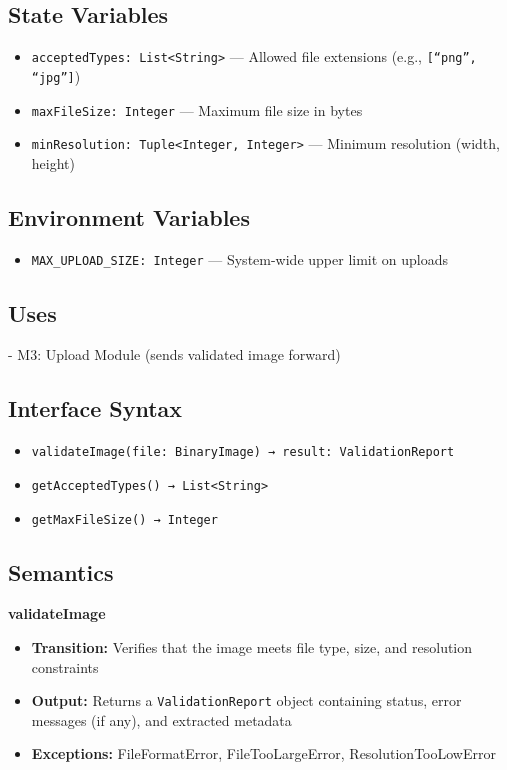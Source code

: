\documentclass[12pt, titlepage]{article}
\begin{document}
\subsection*{State Variables}
\begin{itemize}
  \item \texttt{acceptedTypes: List<String>} — Allowed file extensions (e.g., \texttt{[``png'', ``jpg'']})
  \item \texttt{maxFileSize: Integer} — Maximum file size in bytes
  \item \texttt{minResolution: Tuple<Integer, Integer>} — Minimum resolution (width, height)
\end{itemize}

\subsection*{Environment Variables}
\begin{itemize}
  \item \texttt{MAX\_UPLOAD\_SIZE: Integer} — System-wide upper limit on uploads
\end{itemize}

\subsection*{Uses}
- M3: Upload Module (sends validated image forward)

\subsection*{Interface Syntax}
\begin{itemize}
  \item \texttt{validateImage(file: BinaryImage) → result: ValidationReport}
  \item \texttt{getAcceptedTypes() → List<String>}
  \item \texttt{getMaxFileSize() → Integer}
\end{itemize}

\subsection*{Semantics}

\textbf{validateImage}
\begin{itemize}
  \item \textbf{Transition:} Verifies that the image meets file type, size, and resolution constraints
  \item \textbf{Output:} Returns a \texttt{ValidationReport} object containing status, error messages (if any), and extracted metadata
  \item \textbf{Exceptions:} FileFormatError, FileTooLargeError, ResolutionTooLowError
\end{itemize}
\end{document}
